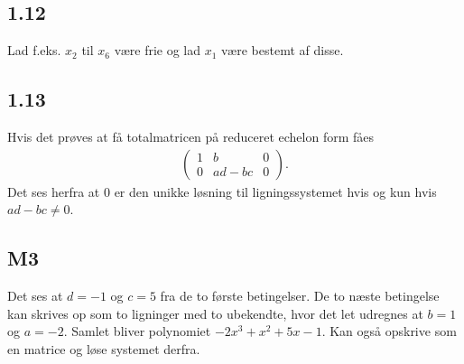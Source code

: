 		\subsection{1.12} 

			Lad f.eks. $x_2$ til $x_6$ være frie og lad $x_1$ være bestemt af disse.

		\subsection{1.13}

			Hvis det prøves at få totalmatricen på reduceret echelon form fåes
				\begin{align*}
					\left(\begin{array}{cc|c} {1} & {b} & {0} \\ {0} & {ad-bc} & {0} \end{array}\right).
				\end{align*} 
			Det ses herfra at $0$ er den unikke løsning til ligningssystemet hvis og kun hvis $ad-bc\neq 0$.

		\subsection{M3}

			Det ses at $d=-1$ og $c=5$ fra de to første betingelser. De to næste betingelse kan skrives op som to ligninger med to ubekendte, hvor det let udregnes at $b=1$ og $a=-2$. Samlet bliver polynomiet $-2x^3+x^2+5x-1$. Kan også opskrive som en matrice og løse systemet derfra.

















